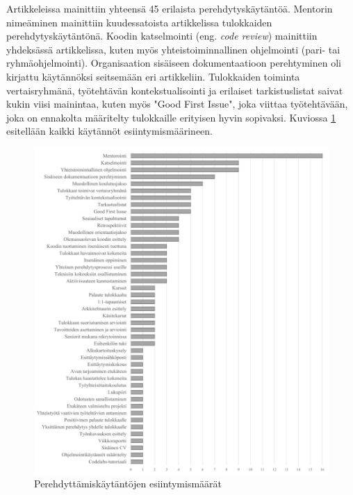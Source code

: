 \documentclass[utf8]{gradu3}
\begin{document}
Artikkeleissa mainittiin yhteensä 45 erilaista perehdytyskäytäntöä. Mentorin nimeäminen mainittiin kuudessatoista artikkelissa tulokkaiden perehdytyskäytäntönä. Koodin katselmointi (eng. \textit{code review}) mainittiin yhdeksässä artikkelissa, kuten myös yhteistoiminnallinen ohjelmointi (pari- tai ryhmäohjelmointi). Organisaation sisäiseen dokumentaatioon perehtyminen oli kirjattu käytännöksi seitsemään eri artikkeliin. Tulokkaiden toiminta vertaisryhmänä, työtehtävän kontekstualisointi ja erilaiset tarkistuslistat saivat kukin viisi mainintaa, kuten myös "Good First Issue", joka viittaa työtehtävään, joka on ennakolta määritelty tulokkaille erityisen hyvin sopivaksi. Kuviossa \ref{kuvio:kaytannot} esitellään kaikki käytännöt esiintymismäärineen.

\begin{figure}[h]
    \centering
    \includegraphics[width=13.2cm]{media/45-kaytannot.png}
    \caption{Perehdyttämiskäytäntöjen esiintymismäärät}
    \label{kuvio:kaytannot}
\end{figure}
\end{document}
